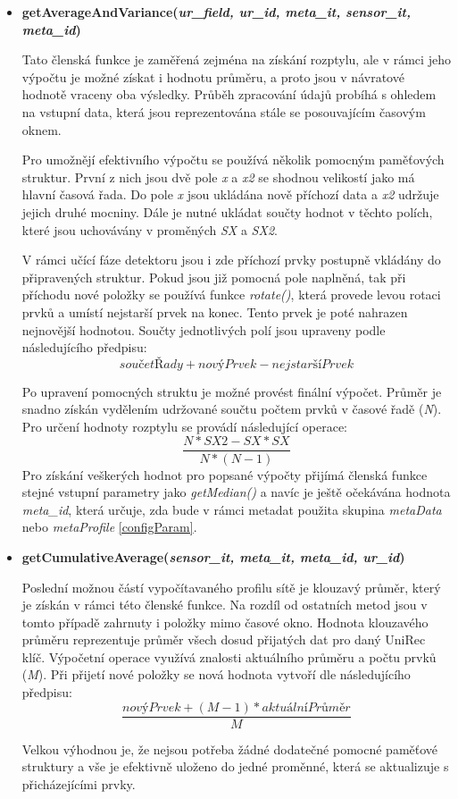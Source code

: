\begin{itemize}
 \item \textbf{getAverageAndVariance(\textit{ur\_field, ur\_id, meta\_it, sensor\_it, meta\_id})}
 
 Tato členská funkce je zaměřená zejména na získání rozptylu, ale v rámci jeho výpočtu je možné
 získat i hodnotu průměru, a proto jsou v návratové hodnotě vraceny oba výsledky. Průběh
 zpracování údajů probíhá s ohledem na vstupní data, která 
 jsou reprezentována stále se posouvajícím časovým oknem. 
 
 Pro umožnějí efektivního výpočtu se používá několik pomocným paměťových struktur. První z nich 
 jsou dvě pole \textit{x} a \textit{x2} se shodnou velikostí jako má hlavní časová řada. Do pole
 \textit{x} jsou ukládána
 nově příchozí data a \textit{x2} udržuje jejich druhé mocniny. Dále je nutné ukládat součty
 hodnot v těchto polích, které jsou uchovávány v proměných \textit{SX} a \textit{SX2}.
 
 V rámci učící fáze detektoru jsou i zde příchozí prvky postupně vkládány do připravených struktur.
 Pokud jsou již pomocná pole naplněná, tak při příchodu nové položky se používá funkce
 \textit{rotate()}, která provede levou rotaci prvků a umístí nejstarší prvek na konec. Tento
 prvek je poté nahrazen nejnovější hodnotou. Součty jednotlivých polí jsou upraveny podle 
 následujícího předpisu:  
 \[
  součetŘady + novýPrvek - nejstaršíPrvek
\]
 
 Po upravení pomocných struktu je možné provést finální výpočet. Průměr je snadno získán vydělením
 udržované součtu počtem prvků v časové řadě (\textit{N}). Pro určení hodnoty rozptylu se provádí
 následující operace:
\[
   \frac{N * SX2 - SX * SX}{N * (N - 1)}
\]
Pro získání veškerých hodnot pro popsané výpočty přijímá členská funkce stejné vstupní parametry
jako \textit{getMedian()} a navíc je ještě očekávána hodnota \textit{meta\_id}, která určuje, 
zda bude v rámci metadat použita skupina \textit{metaData} nebo \textit{metaProfile} \ref{configParam}. 

 \item \textbf{getCumulativeAverage(\textit{sensor\_it, meta\_it, meta\_id, ur\_id})}
 
 Poslední možnou částí vypočítavaného profilu sítě je klouzavý průměr, který je získán v rámci 
 této členské funkce. Na rozdíl od ostatních metod jsou v tomto případě zahrnuty i položky 
 mimo časové okno. Hodnota klouzavého průměru reprezentuje průměr všech dosud přijatých dat pro 
 daný UniRec klíč. Výpočetní operace využívá znalosti aktuálního průměru a počtu prvků (\textit{M}).
 Při přijetí 
 nové položky se nová hodnota vytvoří dle následujícího předpisu:
 \[
   \frac{novýPrvek + (M - 1) * aktuálníPrůměr}{M}
\]
 
 
 Velkou výhodnou je, že nejsou potřeba žádné dodatečné pomocné paměťové struktury a vše je 
 efektivně uloženo do jedné proměnné, která se aktualizuje s přicházejícími prvky.
\end{itemize}

